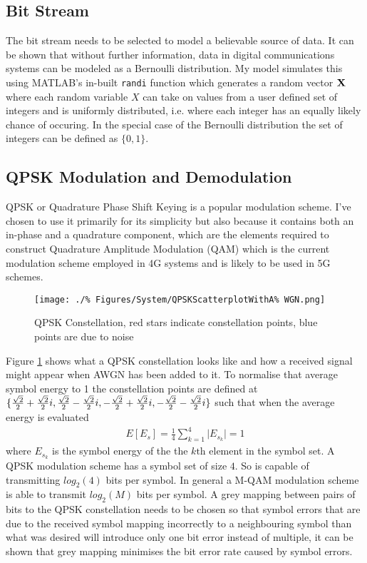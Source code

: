 \subsection{Bit Stream}
The bit stream needs to be selected to model %
a believable source of data. It can be shown %
that without further information, data %
in digital communications systems can be %
modeled as a Bernoulli distribution. %
My model simulates this using MATLAB's in-built %
\texttt{randi} function which generates %
a random vector $\bold{X}$ where each %
random variable $X$ can take on values from %
a user defined set of integers and is %
uniformly distributed, i.e. where each integer %
has an equally likely chance of occuring. In %
the special case of the Bernoulli distribution %
the set of integers can be defined as $\{0,1\}$.

\subsection{QPSK Modulation and Demodulation}
\FloatBarrier
QPSK or Quadrature Phase Shift Keying is a popular %
modulation scheme. I've chosen to use it primarily %
for its simplicity but also because it contains both
an in-phase and a quadrature component, which are%
the elements required to construct %
Quadrature Amplitude Modulation (QAM) %
which is the current modulation scheme employed %
in 4G systems %
and is likely to be used in 5G schemes.

\begin{figure}[ht]
	\centering
	\texttt{[image: ./\%
	Figures/System/QPSKScatterplotWithA\%
	WGN.png]}
	\caption{QPSK Constellation, red stars %
	indicate constellation points, blue %
	points are due to noise}
	\label{fig:QPSKConstellation}
\end{figure}

Figure \ref{fig:QPSKConstellation} shows what %
a QPSK constellation looks like and how a %
received signal might appear when AWGN has %
been added to it. To normalise that average %
symbol energy to 1 the constellation points %
are defined at $\{\frac{\sqrt{2}}{2} + \frac{%
\sqrt{2}}{2}i, \frac{\sqrt{2}}{2} - %
\frac{\sqrt{2}}{2}i, -\frac{\sqrt{2}%
}{2} + \frac{\sqrt{2}}{2}i, %
-\frac{\sqrt{2}}{2} - \frac{\sqrt{2}%
}{2}i\}$ such that when the average %
energy is evaluated
\begin{align}
	E\left[E_s\right] = \frac{1}{4} \sum_{k=1}^{4} %
	\lvert E_{s_{k}} \rvert = 1
\end{align}
where $E_{s_{k}}$ is the symbol energy of the the %
$k\text{th}$ element in the symbol set. A QPSK %
modulation scheme has a symbol set of size $4$. %
So is capable of transmitting $log_{2}(4)$ bits %
per symbol. In general a M-QAM modulation scheme %
is able to transmit $log_{2}(M)$ bits per symbol. %
A grey mapping between pairs of bits to the QPSK %
constellation needs to be chosen so that symbol %
errors that are due to the received symbol mapping %
incorrectly to a neighbouring symbol than what was %
desired will introduce only one bit error instead %
of multiple, it can be shown that grey mapping %
minimises the bit error rate caused by %
symbol errors. %

